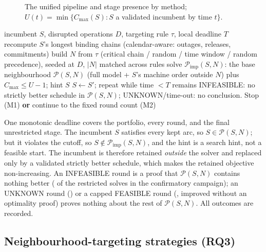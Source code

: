 \documentclass[letterpaper]{article} %
\begin{document}
\begin{figure}[t]
\centering
\scalebox{0.92}{}
\caption{The unified pipeline and stage presence by method; $U(t)=\min\{C_{\max}(S): S$ a validated incumbent by time $t\}$.}
\label{fig:framework}
\end{figure}

\begin{algorithm}[t]
\caption{One round of repeated restricted reoptimization}
\label{alg:round}
\begin{algorithmic}[1]
\REQUIRE incumbent $S$, disrupted operations $D$, targeting rule $\tau$, local deadline $T$
\STATE recompute $S$'s longest binding chains (calendar-aware: outages, releases, commitments)
\STATE build $N$ from $\tau$ (critical chain / random / time window / random precedence), seeded at $D$, $|N|$ matched across rules
\STATE solve $\mathcal{P}_{\mathrm{imp}}(S,N)$: the base neighbourhood $\mathcal{P}(S,N)$ (full model + $S$'s machine order outside $N$) plus $C_{\max}\le U{-}1$; hint $S$
  \STATE $S \gets S'$; repeat while time $<T$ remains
\ELSE
  \STATE INFEASIBLE: no strictly better schedule in $\mathcal{P}(S,N)$; UNKNOWN/time-out: no conclusion. Stop (M1) \textbf{or} continue to the fixed round count (M2)
\ENDIF
\end{algorithmic}
\end{algorithm}

One monotonic deadline covers the portfolio, every round, and the final unrestricted stage. The incumbent $S$ satisfies every kept arc, so $S\in\mathcal{P}(S,N)$; but it violates the cutoff, so $S\notin\mathcal{P}_{\mathrm{imp}}(S,N)$, and the hint is a search hint, not a feasible start. The incumbent is therefore retained \emph{outside} the solver and replaced only by a validated strictly better schedule, which makes the retained objective non-increasing. An INFEASIBLE round is a proof that $\mathcal{P}(S,N)$ contains nothing better (\RestrStatusInfeasible{} of the \RestrStatusTotal{} restricted solves in the confirmatory campaign); an UNKNOWN round (\RestrStatusUnknown) or a capped FEASIBLE round (\RestrStatusFeasible{}, improved without an optimality proof) proves nothing about the rest of $\mathcal{P}(S,N)$. All outcomes are recorded.

\subsection{Neighbourhood-targeting strategies (RQ3)}
\label{sec:lns}
\end{document}
